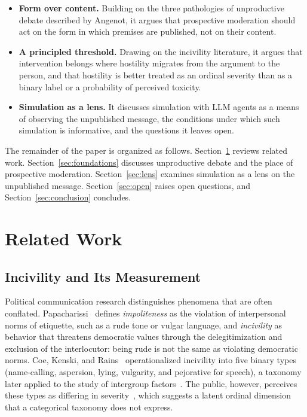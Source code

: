 \documentclass[conference]{IEEEtran}
\begin{document}
\begin{itemize}
\item \textbf{Form over content.} Building on the three pathologies of
unproductive debate described by Angenot, it argues that prospective
moderation should act on the form in which premises are published, not on
their content.
\item \textbf{A principled threshold.} Drawing on the incivility literature,
it argues that intervention belongs where hostility migrates from the argument
to the person, and that hostility is better treated as an ordinal severity
than as a binary label or a probability of perceived toxicity.
\item \textbf{Simulation as a lens.} It discusses simulation with LLM agents
as a means of observing the unpublished message, the conditions under which
such simulation is informative, and the questions it leaves open.
\end{itemize}

The remainder of the paper is organized as follows.
Section~\ref{sec:related} reviews related work. Section~\ref{sec:foundations}
discusses unproductive debate and the place of prospective moderation.
Section~\ref{sec:lens} examines simulation as a lens on the unpublished
message. Section~\ref{sec:open} raises open questions, and
Section~\ref{sec:conclusion} concludes.

\section{Related Work}\label{sec:related}

\subsection{Incivility and Its Measurement}\label{sec:incivility}

Political communication research distinguishes phenomena that are often
conflated. Papacharissi~\cite{papacharissi2004democracy} defines
\textit{impoliteness} as the violation of interpersonal norms of etiquette,
such as a rude tone or vulgar language, and \textit{incivility} as behavior
that threatens democratic values through the delegitimization and exclusion of
the interlocutor: being rude is not the same as violating democratic norms.
Coe, Kenski, and Rains~\cite{coe2014online} operationalized incivility into
five binary types (name-calling, aspersion, lying, vulgarity, and pejorative
for speech), a taxonomy later applied to the study of intergroup
factors~\cite{rains2017incivility}. The public, however, perceives these types
as differing in severity~\cite{kenski2020perceptions}, which suggests a latent
ordinal dimension that a categorical taxonomy does not express.
\end{document}
